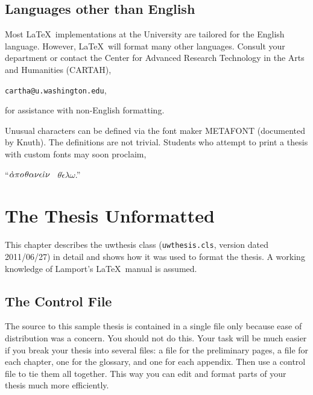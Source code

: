 \documentclass [11pt, twoside] {uwthesis}[2012/02/03]
\let\mffont=\sf
\begin{document}
 
\section{Languages other than English}
 
Most \LaTeX\ implementations at the University are tailored
for the English language.  However, \LaTeX\ will format many
other languages. 
Consult your department or contact the
Center for Advanced Research Technology in the Arts and Humanities (CARTAH),
\smallskip
\begin{center}
{\tt cartha@u.washington.edu},
\end{center}
\smallskip
for assistance with non-English formatting.

Unusual characters can be defined via the
font maker \hbox{\mffont METAFONT} (documented by Knuth\cite{Metafont}).
The definitions are not trivial.
Students who attempt to print a thesis with
custom fonts may soon proclaim,
 
\medskip
\begin{center}
``$\mathaccent"7027\alpha\pi o\kern1pt\theta\alpha\nu\epsilon\hat\iota\nu$
\ $\theta\acute\epsilon\lambda\omega$.''
 
\end{center}
 
 
\chapter{The Thesis Unformatted}
 
This chapter describes the uwthesis class (\texttt{uwthesis.cls},
version dated 2011/06/27)
in detail 
and shows how it was used to format the thesis.
A working knowledge of Lamport's \LaTeX\ manual\cite{Lbook} is assumed.
 
\section{The Control File}
 
The source to this sample thesis is contained in a single file
only because ease of distribution was a concern.
You should not do this.  Your task will be much easier if you
break your thesis into several files:  a file for the preliminary pages,
a file for each chapter,  one for the glossary, and one for each
appendix.  Then use a control file to tie them all together.
This way you can edit and format parts of your thesis much more
efficiently.
 
\end{document}
